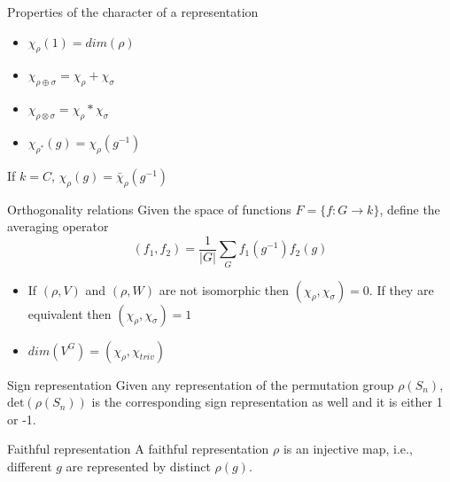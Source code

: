 \documentclass[presentation]{beamer}
\begin{document}
\begin{frame}[label={sec:orgcf8797a}]{Properties of the character of a representation}
\begin{itemize}
\item \(\chi_{\rho}(1) = dim(\rho)\)
\item \(\chi_{\rho \oplus \sigma} = \chi_{\rho} + \chi_{\sigma}\)
\item \(\chi_{\rho \otimes \sigma} = \chi_{\rho} * \chi_{\sigma}\)
\item \(\chi_{\rho^*}(g) = \chi_{\rho}(g^{-1})\)
\end{itemize}

If \(k=C\), \(\chi_{\rho}(g)=\bar{\chi}_{\rho}(g^{-1})\)
\end{frame}


\begin{frame}[label={sec:org95ea15e}]{Orthogonality relations}
Given the space of functions \(F = \{ f: G \rightarrow k \}\), define the
averaging operator $$(f_1,f_2) = \frac{1}{|G|}\sum_G f_1(g^{-1})f_2(g)$$

\begin{itemize}
\item If \((\rho, V)\) and \((\rho, W)\) are not isomorphic then
\((\chi_{\rho},\chi_{\sigma}) = 0\). If they are equivalent then
\((\chi_{\rho},\chi_{\sigma}) = 1\)

\item \(dim(V^G) = (\chi_{\rho}, \chi_{triv})\)
\end{itemize}
\end{frame}
\begin{frame}[label={sec:orgdea1151}]{Sign representation}
Given any representation of the permutation group \(\rho(S_n)\),
\(\textrm{det}(\rho(S_n))\) is the corresponding sign representation as well
and it is either 1 or -1.
\end{frame}

\begin{frame}[label={sec:orgd2c1f78}]{Faithful representation}
A \alert{faithful} representation \(\rho\) is an \alert{injective} map, i.e., different \(g\)
are represented by distinct \(\rho(g)\).
\end{frame}
\end{document}
